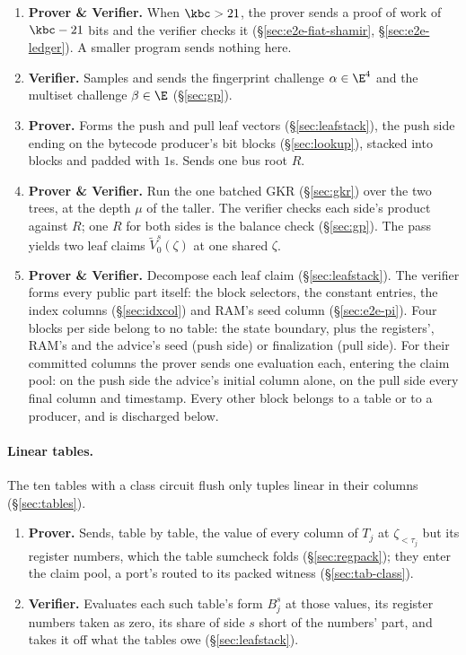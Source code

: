 \begin{enumerate}
\item \textbf{Prover \& Verifier.} When $\kbc>21$, the prover sends a proof of work of $\kbc-21$ bits and the verifier checks it (\S\ref{sec:e2e-fiat-shamir}, \S\ref{sec:e2e-ledger}). A smaller program sends nothing here.
\item \textbf{Verifier.} Samples and sends the fingerprint challenge $\alpha\in\E^{4}$ and the multiset challenge $\beta\in\E$ (\S\ref{sec:gp}).
\item \textbf{Prover.} Forms the push and pull leaf vectors (\S\ref{sec:leafstack}), the push side ending on the bytecode producer's bit blocks (\S\ref{sec:lookup}), stacked into blocks and padded with $1$s. Sends one bus root $R$.
\item \textbf{Prover \& Verifier.} Run the one batched GKR (\S\ref{sec:gkr}) over the two trees, at the depth $\mu$ of the taller. The verifier checks each side's product against $R$; one $R$ for both sides is the balance check (\S\ref{sec:gp}). The pass yields two leaf claims $\widetilde V^{s}_0(\zeta)$ at one shared $\zeta$.
\item \textbf{Prover \& Verifier.} Decompose each leaf claim (\S\ref{sec:leafstack}). The verifier forms every public part itself: the block selectors, the constant entries, the index columns (\S\ref{sec:idxcol}) and RAM's seed column (\S\ref{sec:e2e-pi}). Four blocks per side belong to no table: the state boundary, plus the registers', RAM's and the advice's seed (push side) or finalization (pull side). For their committed columns the prover sends one evaluation each, entering the claim pool: on the push side the advice's initial column alone, on the pull side every final column and timestamp. Every other block belongs to a table or to a producer, and is discharged below.
\end{enumerate}

\paragraph{Linear tables.} The ten tables with a class circuit flush only tuples linear in their columns (\S\ref{sec:tables}).
\begin{enumerate}
\item \textbf{Prover.} Sends, table by table, the value of every column of $T_j$ at $\zeta_{<\tau_j}$ but its register numbers, which the table sumcheck folds (\S\ref{sec:regpack}); they enter the claim pool, a port's routed to its packed witness (\S\ref{sec:tab-class}).
\item \textbf{Verifier.} Evaluates each such table's form $B^{s}_j$ at those values, its register numbers taken as zero, its share of side $s$ short of the numbers' part, and takes it off what the tables owe (\S\ref{sec:leafstack}).
\end{enumerate}

